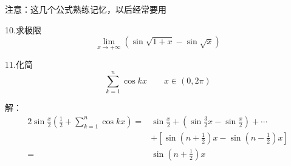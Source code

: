 \documentclass[12pt, a4paper]{ctexart}
\begin{document}
\begin{flushleft}
    注意：这几个公式熟练记忆，以后经常要用
    

    

    10.求极限 \[\lim \limits _{x \rightarrow +\infty} (\sin\sqrt{1+x} - \sin \sqrt{x})\] 

    11.化简\[\sum_{k=1}^n \cos {kx} \qquad x \in (0, 2\pi)\] 

    解：
    \[
    \begin{aligned}
    2\sin \frac{x}{2}\left(\frac{1}{2} + \sum_{k=1}^n \cos {kx}   \right) = &\sin \frac{x}{2} + \left(\sin \frac{3}{2}x - \sin \frac{x}{2}\right) + \cdots \\
    & + \left[ \sin(n + \frac{1}{2}) x - \sin(n - \frac{1}{2})x \right] \\
    = &\sin(n +\frac{1}{2})x
    \end{aligned}
    \]




    \end{flushleft}
\end{document}
